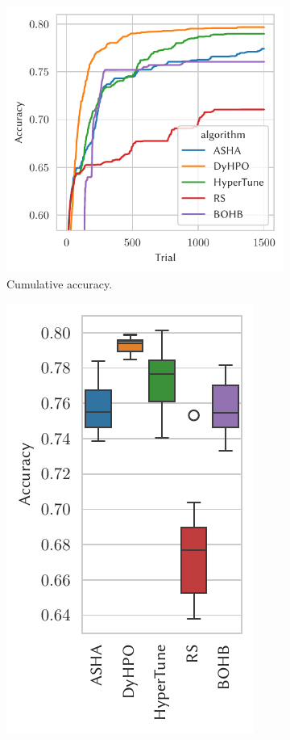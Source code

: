 \begin{figure}[H]
    \begin{subfigure}{.47\textwidth}
        \includegraphics[height=\plotheight]{img/real_exp/cifar10_simple_plot.pdf}%
        \caption{Cumulative accuracy.}%
    \end{subfigure}%
    \begin{subfigure}{.26\textwidth}
        \includegraphics[height=\plotheight]{img/real_exp/cifar10_simple_boxplot_half.pdf}%

\end{subfigure}
\end{figure}
